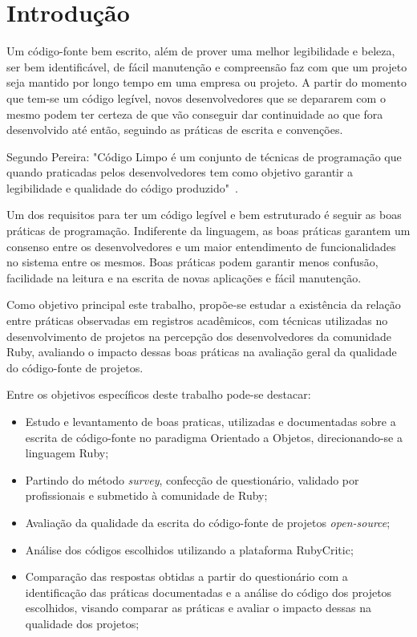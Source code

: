 \documentclass[11pt,a4paper,usenames,dvipsnames]{article}
\begin{document}
\section{Introdução}

Um código-fonte bem escrito, além de prover uma melhor legibilidade e beleza, ser bem identificável, de fácil manutenção e compreensão faz com que um projeto seja mantido por longo tempo em uma empresa ou projeto. A partir do momento que tem-se um código legível, novos desenvolvedores que se depararem com o mesmo podem ter certeza de que vão conseguir dar continuidade ao que fora desenvolvido até então, seguindo as práticas de escrita e convenções.

Segundo Pereira: "Código Limpo é um conjunto de técnicas de programação que
quando praticadas pelos desenvolvedores tem como objetivo garantir a legibilidade e
qualidade do código produzido"~\cite{pereira2016proposta}.

Um dos requisitos para ter um código legível e bem estruturado é seguir as boas práticas de programação. Indiferente da linguagem, as boas práticas garantem um consenso entre os desenvolvedores e um maior entendimento de funcionalidades no sistema entre os mesmos. Boas práticas podem garantir menos confusão, facilidade na leitura e na escrita de novas aplicações e fácil manutenção. 

Como objetivo principal este trabalho, propõe-se estudar a existência da relação entre práticas observadas em registros acadêmicos, com técnicas utilizadas no desenvolvimento de projetos na percepção dos desenvolvedores da comunidade Ruby, avaliando o impacto dessas boas práticas na avaliação geral da qualidade do código-fonte de projetos.

Entre os objetivos específicos deste trabalho pode-se destacar:

\begin{itemize}
    \item Estudo e levantamento de boas praticas, utilizadas e documentadas sobre a escrita de código-fonte no paradigma Orientado a Objetos, direcionando-se a linguagem Ruby; 
    \item Partindo do método \textit{survey}, confecção de questionário, validado por profissionais e submetido à comunidade de Ruby;
	\item Avaliação da qualidade da escrita do código-fonte de projetos \textit{open-source};
	\item Análise dos códigos escolhidos utilizando a plataforma RubyCritic;
	\item Comparação das respostas obtidas a partir do questionário com a identificação das práticas documentadas e a análise do código dos projetos escolhidos, visando comparar as práticas e avaliar o impacto dessas na qualidade dos projetos;
\end{itemize}
\end{document}
